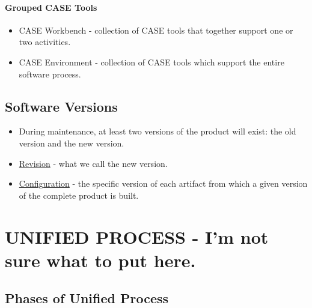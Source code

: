 \documentclass{report}
\begin{document}
				\subsubsection{Grouped CASE Tools}
					\begin{itemize}
						\item CASE Workbench - collection of CASE tools that together support one or two activities.
						\item CASE Environment - collection of CASE tools which support the entire software process.
					\end{itemize}
		\section{Software Versions}
			\begin{itemize}
				\item During maintenance, at least two versions of the product will exist: the old version and the new version.
				\item \underline{Revision} - what we call the new version.
				\item \underline{Configuration} - the specific version of each artifact from which a given version of the complete product is built.
			\end{itemize}
	\chapter{UNIFIED PROCESS - I'm not sure what to put here.}
		\section{Phases of Unified Process}
\end{document}
